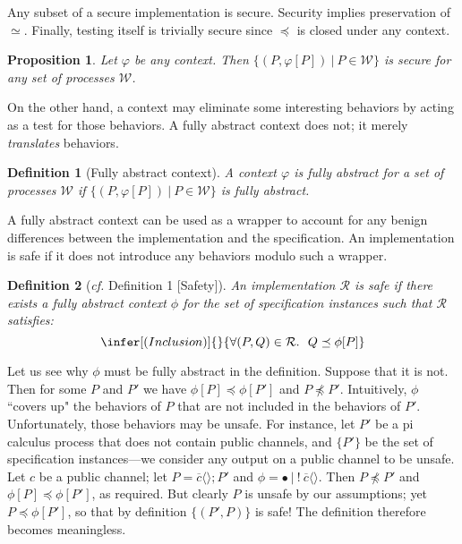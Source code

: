 \documentclass[10pt]{article}
\newtheorem{definition}{Definition}
\newtheorem{proposition}[theorem]{Proposition}
\newcommand{\tup}[1]{\langle #1\rangle}
\newcommand{\pause}{;}
\newcommand{\snd}[3]{\overline{#1}\tup{#2}\pause #3}
\begin{document}
Any subset of a secure implementation is secure. Security implies preservation of $\simeq$. 
Finally, testing itself is trivially secure since $\preceq$ is closed under any context.
\begin{proposition}\label{trivprop} Let $\varphi$ be any context. Then $\{(P,\varphi[P])~|~P \in \mathcal W\}$ is secure for any set of processes $\mathcal W$.
\end{proposition}
\noindent
On the other hand, a context may eliminate some interesting behaviors by acting as a test for those behaviors. A fully abstract context does not; it merely \emph{translates} behaviors. 
\begin{definition}[Fully abstract context] A context $\varphi$ is fully abstract for a set of processes $\mathcal W$ if $\{(P,\varphi[P])~|~P \in \mathcal W\}$ is fully abstract.
\end{definition}
\noindent
A fully abstract context can be used as a wrapper to account for any benign differences between the implementation and the specification. An implementation is safe if it does not introduce any behaviors modulo such a wrapper.
\begin{definition}[\emph{cf.} Definition 1 [Safety$\mbox{]}$]\label{safetydef} An implementation $\mathcal R$ is safe if there exists a fully abstract context $\phi$ for the set of specification instances such that $\mathcal R$ satisfies:$$\infer[(Inclusion)]{}{\forall (P,Q) \in \mathcal R.~~Q \preceq \phi[P]}$$
\end{definition}
\noindent
Let us see why $\phi$ must be fully abstract in the definition. Suppose that it is not. Then for some $P$ and $P'$ we have $\phi[P] \preceq \phi[P']$ and $P \not\preceq P'$. Intuitively, $\phi$ ``covers up" the behaviors of $P$ that are not included in the behaviors of $P'$. 
Unfortunately, those behaviors may be unsafe. For instance, let $P'$ be a pi calculus process \cite{polypi} that does not contain public channels, and $\{P'\}$ be the set of specification instances---we consider any output on a public channel to be unsafe. Let $c$ be a public channel; let $P = \snd c {} P'$ and $\phi = \bullet~|~!\:\overline c \tup{}$. Then $P \not\preceq P'$ and $\phi[P] \preceq \phi[P']$, as required. But clearly $P$ is unsafe by our assumptions; yet $P \preceq \phi[P']$, so that by definition $\{(P',P)\}$ is safe! The definition therefore becomes meaningless. 
\end{document}

